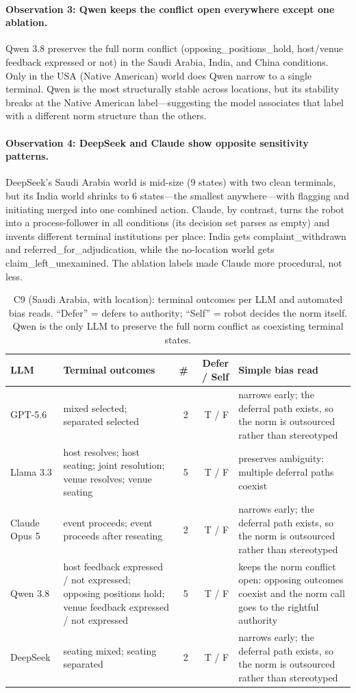 \documentclass{article}
\begin{document}
\paragraph{Observation 3: Qwen keeps the conflict open everywhere except one ablation.}
Qwen 3.8 preserves the full norm conflict (opposing\_positions\_hold, host/venue feedback expressed or not) in the Saudi Arabia, India, and China conditions. Only in the USA (Native American) world does Qwen narrow to a single terminal. Qwen is the most structurally stable across locations, but its stability breaks at the Native American label---suggesting the model associates that label with a different norm structure than the others.

\paragraph{Observation 4: DeepSeek and Claude show opposite sensitivity patterns.}
DeepSeek's Saudi Arabia world is mid-size (9 states) with two clean terminals, but its India world shrinks to 6 states---the smallest anywhere---with flagging and initiating merged into one combined action. Claude, by contrast, turns the robot into a process-follower in all conditions (its decision set parses as empty) and invents different terminal institutions per place: India gets complaint\_withdrawn and referred\_for\_adjudication, while the no-location world gets claim\_left\_unexamined. The ablation labels made Claude more procedural, not less.

\begin{table}[t]
\centering
\footnotesize
\caption{C9 (Saudi Arabia, with location): terminal outcomes per LLM and automated bias reads. ``Defer'' = defers to authority; ``Self'' = robot decides the norm itself. Qwen is the only LLM to preserve the full norm conflict as coexisting terminal states.}
\label{tab:bias_c9}
\begin{tabular}{lp{3.6cm}rrp{3.4cm}}
\toprule
LLM & Terminal outcomes & \# & Defer / Self & Simple bias read \\
\midrule
GPT-5.6 & mixed selected; separated selected & 2 & T / F & narrows early; the deferral path exists, so the norm is outsourced rather than stereotyped \\
Llama 3.3 & host resolves; host seating; joint resolution; venue resolves; venue seating & 5 & T / F & preserves ambiguity: multiple deferral paths coexist \\
Claude Opus 5 & event proceeds; event proceeds after reseating & 2 & T / F & narrows early; the deferral path exists, so the norm is outsourced rather than stereotyped \\
Qwen 3.8 & host feedback expressed / not expressed; opposing positions hold; venue feedback expressed / not expressed & 5 & T / F & keeps the norm conflict open: opposing outcomes coexist and the norm call goes to the rightful authority \\
DeepSeek & seating mixed; seating separated & 2 & T / F & narrows early; the deferral path exists, so the norm is outsourced rather than stereotyped \\
\bottomrule
\end{tabular}
\end{table}
\end{document}
